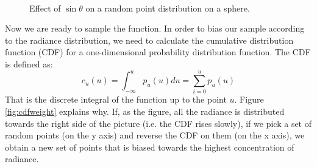 \begin{figure}[!ht]
\centering
{}
 \\
\caption{Effect of $\sin\theta$ on a random point distribution on a sphere.}
\label{fig:randomsamplingsphere}
\end{figure}
Now we are ready to sample the function. In order to bias our sample according to the radiance distribution, we need to calculate the cumulative distribution function (CDF) for a one-dimensional probability distribution function. The CDF is defined as:
$$
c_u(u) = \int_{-\infty}^{u} p_u(u) du = \sum_{i=0}^u p_u(u)
$$
That is the discrete integral of the function up to the point $u$. Figure \ref{fig:cdfweight} explains why. If, as the figure, all the radiance is distributed towards the right side of the picture (i.e. the CDF rises slowly), if we pick a set of random points (on the y axis) and reverse the CDF on them (on the x axis), we obtain a new set of points that is biased towards the highest concentration of radiance.
